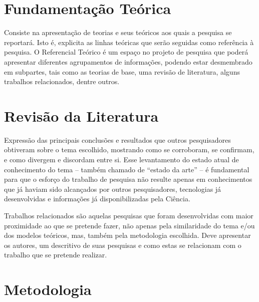 \documentclass[12pt,oneside,a4paper,chapter=TITLE,section=TITLE,sumario=tradicional]{abntex2}
\begin{document}
\chapter{Fundamentação Teórica}
\label{cap:fundamentacao-teorica}

Consiste na apresentação de teorias e seus teóricos aos quais a pesquisa se 
reportará. Isto é, explicita as linhas teóricas que serão seguidas como 
referência à pesquisa. O Referencial Teórico é um espaço no projeto de pesquisa 
que poderá apresentar diferentes agrupamentos de informações, podendo estar 
desmembrado em subpartes, tais como as teorias de base, uma revisão de 
literatura, alguns trabalhos relacionados, dentre outros.

\chapter{Revisão da Literatura}
\label{cap:revisao-literatura}

Expressão das principais conclusões e resultados que outros pesquisadores 
obtiveram sobre o tema escolhido, mostrando como se corroboram, se confirmam, e 
como divergem e discordam entre si. Esse levantamento do estado atual de 
conhecimento do tema – também chamado de ``estado da arte'' – é fundamental para 
que o esforço do trabalho de pesquisa não resulte apenas em conhecimentos que 
já haviam sido alcançados por outros pesquisadores, tecnologias já 
desenvolvidas e informações já disponibilizadas pela Ciência.

Trabalhos relacionados são aquelas pesquisas que foram desenvolvidas com maior 
proximidade ao que se pretende fazer, não apenas pela similaridade do tema e/ou 
dos modelos teóricos, mas, também pela metodologia escolhida. Deve apresentar 
os autores, um descritivo de suas pesquisas e como estas se relacionam com o 
trabalho que se pretende realizar.

\chapter{Metodologia}
\label{cap:metodologia}
\end{document}
